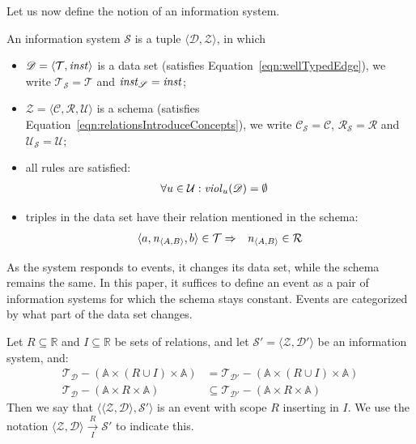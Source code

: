 \documentclass[runningheads]{llncs}
\newcommand{\id}[1]{\text{\it #1\/}}
\newcommand{\instance}{\mathbin{\id{inst}}}
\newcommand{\viol}[2]{\violC{#1}(#2)}
\newcommand{\violC}[1]{\id{viol}_{#1}}
\newcommand{\declare}[3]{\id{#1}_{\pair{#2}{#3}}}
\newcommand{\pair}[2]{\langle{#1},{#2}\rangle}
\newcommand{\triple}[3]{\langle{#1},{#2},{#3}\rangle}
\newcommand{\Atoms}{\mathbb{A}}
\newcommand{\concepts}{\mathcal{C}}
\newcommand{\rels}{\mathcal{R}}   %
\newcommand{\Rels}{\mathbb{R}}   %
\newcommand{\triples}{\mathcal{T}}
\newcommand{\Triple}[3]{#1\times#2\times#3}
\newcommand{\rules}{\mathcal{U}}
\newcommand{\dataset}{\mathscr{D}}
\newcommand{\schema}{\mathscr{Z}}
\newcommand{\infsys}{\mathscr{S}}
\def\define#1{\label{dfn:#1}{\em #1}\index{#1}}
\begin{document}
   Let us now define the notion of an information system.
\begin{definition}
\label{def:information system}
\item An information system $\infsys$ is a tuple $\pair{\dataset}{\schema}$, in which
\begin{itemize}
   \item $\dataset=\pair{\triples}{\instance}$ is a data set (satisfies Equation~\ref{eqn:wellTypedEdge}), we write $\triples_\infsys = \triples$ and $\instance_\infsys = \instance$;
   \item $\schema=\triple{\concepts}{\rels}{\rules}$ is a schema (satisfies Equation~\ref{eqn:relationsIntroduceConcepts}), we write $\concepts_\infsys = \concepts$, $\rels_\infsys = \rels$ and $\rules_\infsys=\rules$;
   \item all rules are satisfied:
   \begin{eqnarray}
   \forall u\in\rules&:\viol{u}{\dataset}=\emptyset
   \label{eqn:satisfaction}
   \end{eqnarray}
   \item triples in the data set have their relation mentioned in the schema:
   \begin{eqnarray}
   \triple{a}{\declare{n}{A}{B}}{b}\in\triples&\Rightarrow&\declare{n}{A}{B}\in\rels
   \label{eqn:define R}
   \end{eqnarray}
\end{itemize}
\end{definition}

   As the system responds to events, it changes its data set, while the schema remains the same.
   In this paper, it suffices to define an event as a pair of information systems for which the schema stays constant.
   Events are categorized by what part of the data set changes.
   
   \begin{definition}[Event]
   Let $R \subseteq \Rels$ and $I \subseteq \Rels$ be sets of relations, and let $\infsys' = \pair{\schema}{\dataset'}$ be an information system, and:
      \begin{align}
      \triples_{\dataset} - (\Triple{\Atoms}{(R \cup I)}{\Atoms}) &= \triples_{\dataset'} - (\Triple{\Atoms}{(R \cup I)}{\Atoms})
   \label{eqn:eventUnchanged}\\
      \triples_{\dataset} - (\Triple{\Atoms}{R}{\Atoms}) &\subseteq \triples_{\dataset'} - (\Triple{\Atoms}{R}{\Atoms})
   \label{eqn:eventInsert}
   \end{align}
   Then we say that $\pair{\pair{\schema}{\dataset}}{\infsys'}$ is an event with scope $R$ inserting in $I$.
   We use the notation $\pair{\schema}{\dataset} \xrightarrow[I]{R} \infsys'$ to indicate this.
   \end{definition}
   
\end{document}
